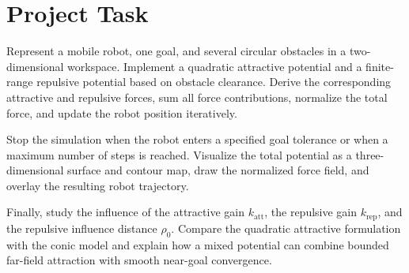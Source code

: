 \documentclass[10pt,twocolumn,a4paper]{article}
\begin{document}
\section{Project Task}

Represent a mobile robot, one goal, and several circular obstacles in a
two-dimensional workspace. Implement a quadratic attractive potential and
a finite-range repulsive potential based on obstacle clearance. Derive the
corresponding attractive and repulsive forces, sum all force contributions,
normalize the total force, and update the robot position iteratively.

Stop the simulation when the robot enters a specified goal tolerance or
when a maximum number of steps is reached. Visualize the total potential as
a three-dimensional surface and contour map, draw the normalized force
field, and overlay the resulting robot trajectory.

Finally, study the influence of the attractive gain
$k_{\mathrm{att}}$, the repulsive gain $k_{\mathrm{rep}}$, and the
repulsive influence distance $\rho_0$. Compare the quadratic attractive
formulation with the conic model and explain how a mixed potential can
combine bounded far-field attraction with smooth near-goal convergence.

\end{document}
